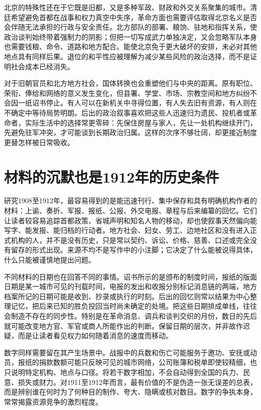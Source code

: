 北京的特殊性还在于它既是旧都，又是多种军政、财政和外交关系聚集的城市。清廷希望避免首都在战事和权力真空中失序，革命方面也需要评估取得北京名义是否会伴随无法承担的行政与安全责任。北方部队的部署、粮饷、驻地和指挥关系，使政治谈判始终带着强制力的阴影；但把一切写成武力单独决定，又会忽略军队本身也需要钱粮、命令、道路和地方配合。能使北京免于更大破坏的安排，未必对其他地点具有同样后果。退位的和平性应被理解为减少某些风险的政治选择，而不是证明社会成本已经消失。

对于旧朝官员和北方地方社会，国体转换也会重塑他们与中央的距离。原有职位、荣衔、俸给和网络的意义发生变化，但县署、学堂、市场、宗教空间和地方纠纷不会因一纸诏书停止。有人可以在新机关中寻得位置，有人失去旧有资源，有人则在不确定中等待局势明朗。后出的政治叙事喜欢把这些人迅速归为遗民、投机者或革命者，实际生活中的选择常更零碎：先保住房屋与家人，先让一处机构继续开门，先避免驻军冲突，才可能谈到长期政治归属。这样的次序不够壮阔，却更接近制度更替怎样被日常吸收。

\section{材料的沉默也是1912年的历史条件}

研究1908至1912年，最容易得到的是能迅速刊行、集中保存和具有明确机构作者的材料：上谕、奏折、军报、报纸、公报、外交电报、章程与后来编纂的回忆。它们让读者较容易追踪首都政策、省城声明和知名人物的移动，却也使叙事天然偏向能写字、能发报、能归档的行动者。地方社会、妇女、劳工、边地社区和没有进入正式机构的人，并不是没有历史，只是常以契约、诉讼、价格、慈善、口述或完全没有留存的形式出现。来源不均不是写作中的小注脚；它决定了什么能被说得具体，什么只能被谨慎地提出问题。

不同材料的日期也在回答不同的事情。诏书所示的是颁布的制度时间，报纸的版面日期是某一城市可见的刊载时间，电报的发出和收报分别标记消息链的两端，地方档案所记的日期可能是收到、抄录或执行的时刻。后出的回忆则常以结果为中心整理记忆，把后来已知的胜负投回当时尚未确定的处境。把这些日期排成单线，往往会制造不存在的同步性。特别是在革命消息、调兵和谈判交织的月份，数日的先后就可能改变地方官、军官或商人所能作出的判断。保留日期的层次，并非故作迟疑，而是让读者看见权力如何随着消息的速度而移动。

数字同样需要留在其产生场景中。战报中的兵数和伤亡可能服务于邀功、安抚或动员，报纸的捐款数额可能只反映可见的城市网络，公司账簿和税单即使较精细，也只说明特定机构、地点与口径。将若干数字相加，不会自动得到全国的兵力、民意、损失或财力。对1911至1912年而言，最有价值的不是伪造一张无误差的总表，而是辨别谁在何时为了何种目的制作、夸大、隐瞒或核对数目。数字的争执本身，常常揭露资源竞争的激烈程度。

